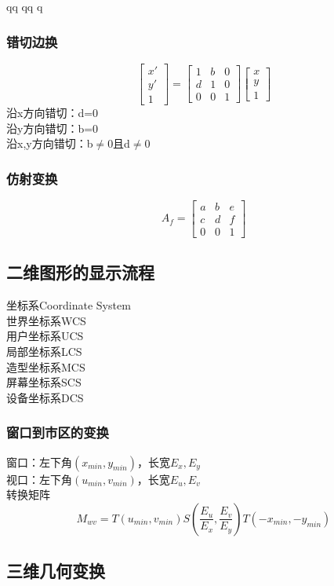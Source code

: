 qq	qq	q                                                                                                                                                                                                                                                                                      \documentclass{article}
\begin{document}
\begin{CJK}{UTF8}{gbsn}
	\subsubsection{错切边换}
	$$\begin{bmatrix}
	x'\\y'\\1	
	\end{bmatrix}=\begin{bmatrix}
	1&b&0\\d&1&0\\0&0&1
	\end{bmatrix}
	\begin{bmatrix}
	x\\y\\1
	\end{bmatrix}
	$$
	沿x方向错切：d=0\\
	沿y方向错切：b=0\\
	沿x,y方向错切：b$\neq$0且d$\neq$0\\
	\subsubsection{仿射变换}
	$$
	A_f=
	\begin{bmatrix}
	a&b&e\\c&d&f\\0&0&1
	\end{bmatrix}
	$$
	\subsection{二维图形的显示流程}
	坐标系Coordinate System\\
	世界坐标系WCS\\
	用户坐标系UCS\\
	局部坐标系LCS\\
	造型坐标系MCS\\
	屏幕坐标系SCS\\
	设备坐标系DCS\\
	\subsubsection{窗口到市区的变换}
	窗口：左下角$(x_{min},y_{min})$，长宽$E_x,E_y$\\
	视口：左下角$(u_{min},v_{min})$，长宽$E_u,E_v$\\
	转换矩阵\\
	$$
	M_{wv}=T(u_{min},v_{min})S(\frac{E_u}{E_x},\frac{E_v}{E_y})T(-x_{min},-y_{min})
	$$
	\subsection{三维几何变换}

\end{CJK}
\end{document}
